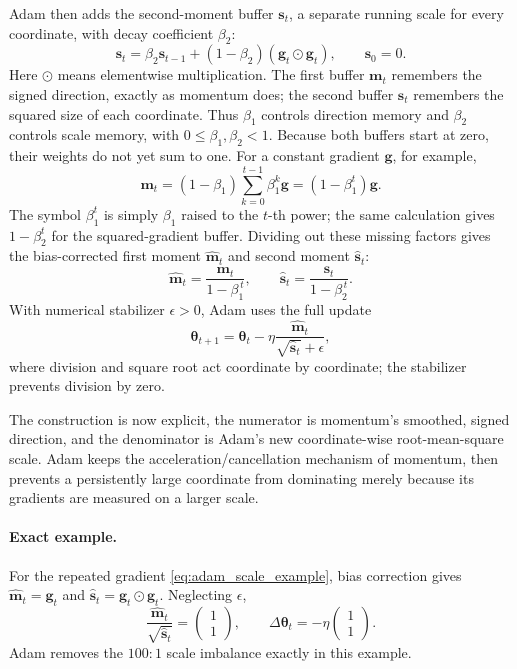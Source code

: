 \documentclass[11pt,letterpaper]{article}
\newcommand{\thet}{\bm{\theta}}
\begin{document}
Adam then adds the second-moment buffer \(\bm s_t\), a separate running
scale for every coordinate, with decay coefficient \(\beta_2\):
\begin{equation}
  \bm s_t
  =\beta_2\bm s_{t-1}
   +(1-\beta_2)(\bm g_t\odot\bm g_t),
  \qquad \bm s_0=0.
\end{equation}
Here \(\odot\) means elementwise multiplication. The first buffer
\(\bm m_t\) remembers the signed direction, exactly as momentum does; the
second buffer \(\bm s_t\) remembers the squared size of each coordinate.
Thus \(\beta_1\) controls direction memory and \(\beta_2\) controls scale
memory, with \(0\leq\beta_1,\beta_2<1\).
Because both buffers start at zero, their weights do not yet sum to one. For a
constant gradient \(\bm g\), for example,
\begin{equation}
  \bm m_t
  =(1-\beta_1)\sum_{k=0}^{t-1}\beta_1^k\bm g
  =(1-\beta_1^t)\bm g.
\end{equation}
The symbol \(\beta_1^t\) is simply \(\beta_1\) raised to the \(t\)-th power;
the same calculation gives \(1-\beta_2^t\) for the squared-gradient buffer.
Dividing out these missing factors gives the bias-corrected first moment
\(\widehat{\bm m}_t\) and second moment \(\widehat{\bm s}_t\):
\begin{equation}\label{eq:bias_correction}
  \widehat{\bm m}_t=\frac{\bm m_t}{1-\beta_1^{\,t}},
  \qquad
  \widehat{\bm s}_t=\frac{\bm s_t}{1-\beta_2^{\,t}}.
\end{equation}
With numerical stabilizer \(\epsilon>0\), Adam uses the full update
\begin{equation}\label{eq:adam_step}
  \thet_{t+1}
  =\thet_t-\eta\frac{\widehat{\bm m}_t}
    {\sqrt{\widehat{\bm s}_t}+\epsilon},
\end{equation}
where division and square root act coordinate by coordinate; the stabilizer
prevents division by zero.

The construction is now explicit, the numerator is momentum's smoothed,
signed direction, and the denominator is Adam's new coordinate-wise
root-mean-square scale. Adam keeps the acceleration/cancellation mechanism of
momentum, then prevents a persistently large coordinate from dominating merely
because its gradients are measured on a larger scale.

\paragraph{Exact example.}
For the repeated gradient \eqref{eq:adam_scale_example}, bias correction gives
\(\widehat{\bm m}_t=\bm g_t\) and
\(\widehat{\bm s}_t=\bm g_t\odot\bm g_t\). Neglecting \(\epsilon\),
\begin{equation}
  \frac{\widehat{\bm m}_t}{\sqrt{\widehat{\bm s}_t}}
  =\begin{pmatrix}1\\1\end{pmatrix},
  \qquad
  \Delta\thet_t=-\eta\begin{pmatrix}1\\1\end{pmatrix}.
\end{equation}
Adam removes the \(100{:}1\) scale imbalance exactly in this example.
\end{document}
